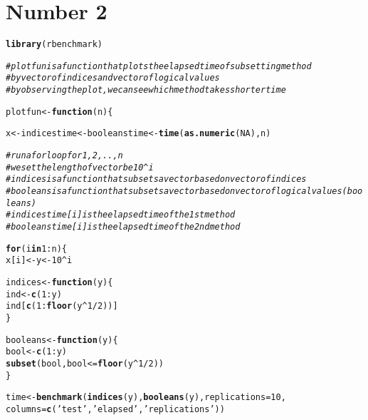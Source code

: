 \documentclass[english]{article}\usepackage[]{graphicx}\usepackage[]{color}
\makeatletter
\newcommand{\hlnum}[1]{\textcolor[rgb]{0.686,0.059,0.569}{#1}}%
\newcommand{\hlstr}[1]{\textcolor[rgb]{0.192,0.494,0.8}{#1}}%
\newcommand{\hlcom}[1]{\textcolor[rgb]{0.678,0.584,0.686}{\textit{#1}}}%
\newcommand{\hlopt}[1]{\textcolor[rgb]{0,0,0}{#1}}%
\newcommand{\hlstd}[1]{\textcolor[rgb]{0.345,0.345,0.345}{#1}}%
\newcommand{\hlkwa}[1]{\textcolor[rgb]{0.161,0.373,0.58}{\textbf{#1}}}%
\newcommand{\hlkwb}[1]{\textcolor[rgb]{0.69,0.353,0.396}{#1}}%
\newcommand{\hlkwc}[1]{\textcolor[rgb]{0.333,0.667,0.333}{#1}}%
\newcommand{\hlkwd}[1]{\textcolor[rgb]{0.737,0.353,0.396}{\textbf{#1}}}%
\newenvironment{kframe}{%
 \def\at@end@of@kframe{}%
 \ifinner\ifhmode%
  \def\at@end@of@kframe{\end{minipage}}%
  \begin{minipage}{\columnwidth}%
 \fi\fi%
 \def\FrameCommand##1{\hskip\@totalleftmargin \hskip-\fboxsep
 \colorbox{shadecolor}{##1}\hskip-\fboxsep
     \hskip-\linewidth \hskip-\@totalleftmargin \hskip\columnwidth}%
 \MakeFramed {\advance\hsize-\width
   \@totalleftmargin\z@ \linewidth\hsize
   \@setminipage}}%
 {\par\unskip\endMakeFramed%
 \at@end@of@kframe}
\newenvironment{knitrout}{}{} %
\makeatother
\begin{document}
\section*{Number 2}

\begin{knitrout}
\color{fgcolor}\begin{kframe}
\begin{alltt}
\hlkwd{library}\hlstd{(rbenchmark)}


\hlcom{# plotfun is a function that plots the elapsed time of subsetting method}
\hlcom{# by vector of indices and vector of logical values}
\hlcom{# by observing the plot, we can see which method takes shorter time}

\hlstd{plotfun} \hlkwb{<-} \hlkwa{function}\hlstd{(}\hlkwc{n}\hlstd{) \{}

        \hlstd{x} \hlkwb{<-} \hlstd{indicestime} \hlkwb{<-} \hlstd{booleanstime} \hlkwb{<-} \hlkwd{time}\hlstd{(}\hlkwd{as.numeric}\hlstd{(}\hlnum{NA}\hlstd{), n)}

        \hlcom{# run a for loop for 1,2,..,n}
        \hlcom{# we set the length of vector be 10^i}
        \hlcom{# indices is a function that subsets a vector based on vector of indices}
        \hlcom{# booleans is a function that subsets a vector based on vector of logical values (booleans)}
        \hlcom{# indicestime[i] is the elapsed time of the 1st method}
        \hlcom{# booleanstime[i] is the elapsed time of the 2nd method}

        \hlkwa{for} \hlstd{(i} \hlkwa{in} \hlnum{1}\hlopt{:}\hlstd{n) \{}
                \hlstd{x[i]} \hlkwb{<-} \hlstd{y} \hlkwb{<-} \hlnum{10}\hlopt{^}\hlstd{i}

        \hlstd{indices} \hlkwb{<-} \hlkwa{function}\hlstd{(}\hlkwc{y}\hlstd{) \{}
        \hlstd{ind} \hlkwb{<-} \hlkwd{c}\hlstd{(}\hlnum{1}\hlopt{:}\hlstd{y)}
        \hlstd{ind[}\hlkwd{c}\hlstd{(}\hlnum{1}\hlopt{:}\hlkwd{floor}\hlstd{(y}\hlopt{^}\hlnum{1}\hlopt{/}\hlnum{2}\hlstd{))]}
        \hlstd{\}}

                \hlstd{booleans} \hlkwb{<-} \hlkwa{function}\hlstd{(}\hlkwc{y}\hlstd{) \{}
                  \hlstd{bool} \hlkwb{<-} \hlkwd{c}\hlstd{(}\hlnum{1}\hlopt{:}\hlstd{y)}
                  \hlkwd{subset}\hlstd{(bool, bool} \hlopt{<=} \hlkwd{floor}\hlstd{(y}\hlopt{^}\hlnum{1}\hlopt{/}\hlnum{2}\hlstd{))}
        \hlstd{\}}

                \hlstd{time} \hlkwb{<-} \hlkwd{benchmark}\hlstd{(}\hlkwd{indices}\hlstd{(y),} \hlkwd{booleans}\hlstd{(y),} \hlkwc{replications} \hlstd{=} \hlnum{10}\hlstd{,}
                                                        \hlkwc{columns}\hlstd{=}\hlkwd{c}\hlstd{(}\hlstr{'test'}\hlstd{,} \hlstr{'elapsed'}\hlstd{,} \hlstr{'replications'}\hlstd{))}


\end{alltt}
\end{kframe}
\end{knitrout}
\end{document}
